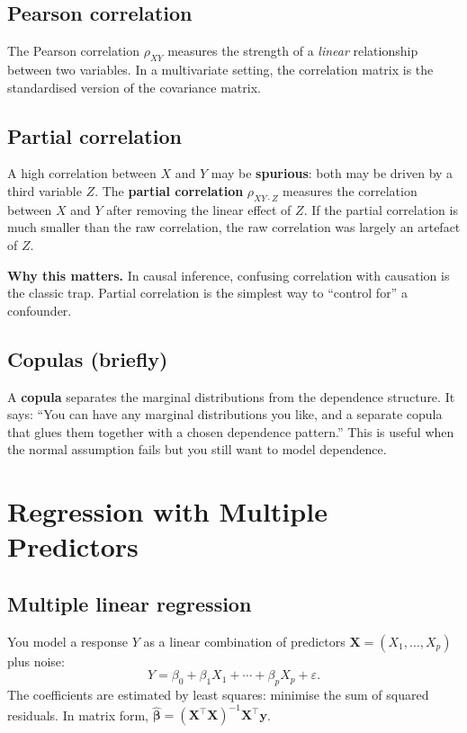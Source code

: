 \documentclass[11pt,a4paper]{article}
\newcommand{\vect}[1]{\mathbf{#1}}
\newcommand{\mat}[1]{\mathbf{#1}}
\begin{document}
\subsection{Pearson correlation}
The Pearson correlation $\rho_{XY}$ measures the strength of a
\emph{linear} relationship between two variables.  In a multivariate
setting, the correlation matrix is the standardised version of the
covariance matrix.

\subsection{Partial correlation}
A high correlation between $X$ and $Y$ may be \textbf{spurious}: both
may be driven by a third variable $Z$.  The \textbf{partial
correlation} $\rho_{XY\cdot Z}$ measures the correlation between $X$
and $Y$ after removing the linear effect of $Z$.
If the partial correlation is much smaller than the raw correlation,
the raw correlation was largely an artefact of $Z$.

\textbf{Why this matters.}  In causal inference, confusing correlation
with causation is the classic trap.  Partial correlation is the
simplest way to ``control for'' a confounder.

\subsection{Copulas (briefly)}
A \textbf{copula} separates the marginal distributions from the
dependence structure.  It says: ``You can have any marginal
distributions you like, and a separate copula that glues them together
with a chosen dependence pattern.''  This is useful when the
normal assumption fails but you still want to model dependence.

\section{Regression with Multiple Predictors}

\subsection{Multiple linear regression}
You model a response $Y$ as a linear combination of predictors
$\vect{X}=(X_1,\dots,X_p)$ plus noise:
\[
Y = \beta_0 + \beta_1 X_1 + \cdots + \beta_p X_p + \varepsilon .
\]
The coefficients are estimated by least squares: minimise the sum of
squared residuals.  In matrix form, $\hat{\boldsymbol{\beta}} =
(\mat{X}^\top\mat{X})^{-1}\mat{X}^\top\vect{y}$.
\end{document}
